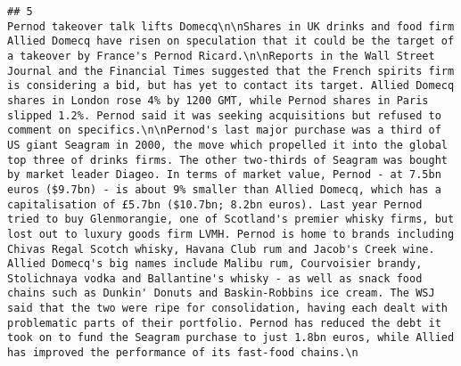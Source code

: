 \documentclass[
]{article}
\begin{document}
\begin{verbatim}
## 5                                                                                                                                                                                                                                                                                                                                                                                                                                                                                                                                                                                                                                                                                                                                                                                                                                                                                                                                                                                                                                   Pernod takeover talk lifts Domecq\n\nShares in UK drinks and food firm Allied Domecq have risen on speculation that it could be the target of a takeover by France's Pernod Ricard.\n\nReports in the Wall Street Journal and the Financial Times suggested that the French spirits firm is considering a bid, but has yet to contact its target. Allied Domecq shares in London rose 4% by 1200 GMT, while Pernod shares in Paris slipped 1.2%. Pernod said it was seeking acquisitions but refused to comment on specifics.\n\nPernod's last major purchase was a third of US giant Seagram in 2000, the move which propelled it into the global top three of drinks firms. The other two-thirds of Seagram was bought by market leader Diageo. In terms of market value, Pernod - at 7.5bn euros ($9.7bn) - is about 9% smaller than Allied Domecq, which has a capitalisation of £5.7bn ($10.7bn; 8.2bn euros). Last year Pernod tried to buy Glenmorangie, one of Scotland's premier whisky firms, but lost out to luxury goods firm LVMH. Pernod is home to brands including Chivas Regal Scotch whisky, Havana Club rum and Jacob's Creek wine. Allied Domecq's big names include Malibu rum, Courvoisier brandy, Stolichnaya vodka and Ballantine's whisky - as well as snack food chains such as Dunkin' Donuts and Baskin-Robbins ice cream. The WSJ said that the two were ripe for consolidation, having each dealt with problematic parts of their portfolio. Pernod has reduced the debt it took on to fund the Seagram purchase to just 1.8bn euros, while Allied has improved the performance of its fast-food chains.\n

\end{verbatim}
\end{document}
